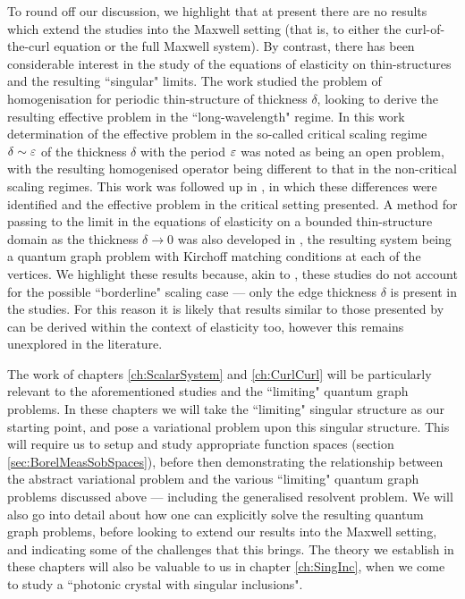 To round off our discussion, we highlight that at present there are no results which extend the studies \cite{kuchment2001convergence, kuchment2003asymptotics, exner2005convergence} into the Maxwell setting (that is, to either the curl-of-the-curl equation or the full Maxwell system).
By contrast, there has been considerable interest in the study of the equations of elasticity on thin-structures and the resulting ``singular" limits.
The work \cite{zhikov2002homogenization} studied the problem of homogenisation for periodic thin-structure of thickness $\delta$, looking to derive the resulting effective problem in the ``long-wavelength" regime.
In this work determination of the effective problem in the so-called critical scaling regime $\delta\sim\varepsilon$ of the thickness $\delta$ with the period $\varepsilon$ was noted as being an open problem, with the resulting homogenised operator being different to that in the non-critical scaling regimes.
This work was followed up in \cite{zhikov2003homogenization}, in which these differences were identified and the effective problem in the critical setting presented.
A method for passing to the limit in the equations of elasticity on a bounded thin-structure domain as the thickness $\delta\rightarrow0$ was also developed in \cite{zhikov2006derivation}, the resulting system being a quantum graph problem with Kirchoff matching conditions at each of the vertices.
We highlight these results because, akin to \cite{kuchment2001convergence}, these studies do not account for the possible ``borderline" scaling case --- only the edge thickness $\delta$ is present in the studies.
For this reason it is likely that results similar to those presented by \cite{exner2005convergence} can be derived within the context of elasticity too, however this remains unexplored in the literature.

The work of chapters \ref{ch:ScalarSystem} and \ref{ch:CurlCurl} will be particularly relevant to the aforementioned studies and the ``limiting" quantum graph problems.
In these chapters we will take the ``limiting" singular structure as our starting point, and pose a variational problem upon this singular structure.
This will require us to setup and study appropriate function spaces (section \ref{sec:BorelMeasSobSpaces}), before then demonstrating the relationship between the abstract variational problem and the various ``limiting" quantum graph problems discussed above --- including the generalised resolvent problem.
We will also go into detail about how one can explicitly solve the resulting quantum graph problems, before looking to extend our results into the Maxwell setting, and indicating some of the challenges that this brings.
The theory we establish in these chapters will also be valuable to us in chapter \ref{ch:SingInc}, when we come to study a ``photonic crystal with singular inclusions".